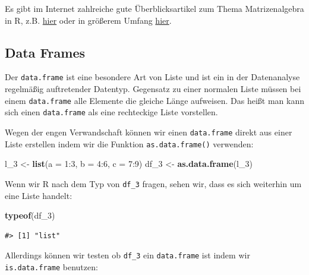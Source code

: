 \documentclass[]{tufte-book}
\newenvironment{Shaded}{}{}
\newcommand{\KeywordTok}[1]{\textcolor[rgb]{0.00,0.44,0.13}{\textbf{#1}}}
\newcommand{\DataTypeTok}[1]{\textcolor[rgb]{0.56,0.13,0.00}{#1}}
\newcommand{\DecValTok}[1]{\textcolor[rgb]{0.25,0.63,0.44}{#1}}
\newcommand{\StringTok}[1]{\textcolor[rgb]{0.25,0.44,0.63}{#1}}
\newcommand{\OperatorTok}[1]{\textcolor[rgb]{0.40,0.40,0.40}{#1}}
\newcommand{\NormalTok}[1]{#1}
\begin{document}
Es gibt im Internet zahlreiche gute Überblicksartikel zum Thema
Matrizenalgebra in R, z.B.
\href{https://www.statmethods.net/advstats/matrix.html}{hier} oder in
größerem Umfang
\href{https://www.math.uh.edu/~jmorgan/Math6397/day13/LinearAlgebraR-Handout.pdf}{hier}.

\subsection{Data Frames}\label{data-frames}

Der \texttt{data.frame} ist eine besondere Art von Liste und ist ein in
der Datenanalyse regelmäßig auftretender Datentyp. Gegensatz zu einer
normalen Liste müssen bei einem \texttt{data.frame} alle Elemente die
gleiche Länge aufweisen. Das heißt man kann sich einen
\texttt{data.frame} als eine rechteckige Liste vorstellen.

Wegen der engen Verwandschaft können wir einen \texttt{data.frame}
direkt aus einer Liste erstellen indem wir die Funktion
\texttt{as.data.frame()} verwenden:

\begin{Shaded}
\begin{Highlighting}[]
\NormalTok{l_}\DecValTok{3}\NormalTok{ <-}\StringTok{ }\KeywordTok{list}\NormalTok{(}\DataTypeTok{a =} \DecValTok{1}\OperatorTok{:}\DecValTok{3}\NormalTok{, }\DataTypeTok{b =} \DecValTok{4}\OperatorTok{:}\DecValTok{6}\NormalTok{, }\DataTypeTok{c =} \DecValTok{7}\OperatorTok{:}\DecValTok{9}\NormalTok{)}
\NormalTok{df_}\DecValTok{3}\NormalTok{ <-}\StringTok{ }\KeywordTok{as.data.frame}\NormalTok{(l_}\DecValTok{3}\NormalTok{)}
\end{Highlighting}
\end{Shaded}

Wenn wir R nach dem Typ von \texttt{df\_3} fragen, sehen wir, dass es
sich weiterhin um eine Liste handelt:

\begin{Shaded}
\begin{Highlighting}[]
\KeywordTok{typeof}\NormalTok{(df_}\DecValTok{3}\NormalTok{)}
\end{Highlighting}
\end{Shaded}

\begin{verbatim}
#> [1] "list"
\end{verbatim}

Allerdings können wir testen ob \texttt{df\_3} ein \texttt{data.frame}
ist indem wir \texttt{is.data.frame} benutzen:
\end{document}
